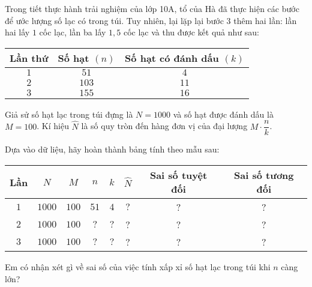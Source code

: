 \begin{vd}
	Trong tiết thực hành trải nghiệm của lớp 10A, tổ của Hà đã thực hiện các bước để ước lượng số lạc có trong túi. Tuy nhiên, lại lặp lại bước 3 thêm hai lần: lần hai lấy $ 1 $ cốc lạc, lần ba lấy $1{,}5$ cốc lạc và thu được kết quả như sau: 
	\begin{center}
		\begin{tabular}{|c|c|c|}
			\hline 
			Lần thứ & Số hạt $(n)$ & Số hạt có đánh dấu $(k)$\\
			\hline 
			$1$ & $51$ & $4$\\
			\hline 
			$2$ & $103$ & $11$\\
			\hline 
			$3$ & $155$ & $16$\\
			\hline 
		\end{tabular}
	\end{center}
Giả sử số hạt lạc trong túi đựng là $N=1000$ và số hạt được đánh dấu là $M=100$. Kí hiệu $\widehat{N}$ là số quy tròn đến hàng đơn vị của đại lượng $M\cdot \dfrac{n}{k}$.
\begin{enumEX}{1}
	\item Dựa vào dữ liệu, hãy hoàn thành bảng tính theo mẫu sau:
	\begin{center}
		\begin{tabular}{|c|c|c|c|c|c|c|c|}
			\hline 
			Lần & $N$ & $M$ & $n$ & $k$ & $\widehat{N}$ & Sai số tuyệt đối & Sai số tương đối\\
			\hline
			$1$ & $1000$ & $100$ & $51$ & $4$ & $ ? $ & ? & ?\\
			\hline
			$2$ & $1000$ & $100$ & $?$ & $?$ & ? & ? & ?\\
			\hline
			$3$ & $1000$ & $100$ & $?$ & $?$ & ? & ? & ?\\
			\hline
		\end{tabular}
	\end{center}
\item Em có nhận xét gì về sai số của việc tính xấp xỉ số hạt lạc trong túi khi $n$ càng lớn?
\end{enumEX}
\end{vd}

